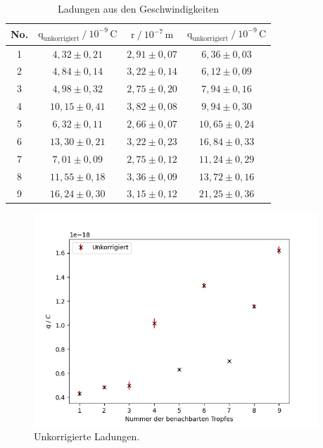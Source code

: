 \begin{table}[H]
    \centering
    \caption{Ladungen aus den Geschwindigkeiten} 
    \label{Tabelle3}
    \begin{tabular} {c  c  c  c}
        \toprule
        { No.} &
        {$\text{q}_{\text{unkorrigiert}} \mathbin{/} 10^{-9}\,\unit{\coulomb}$} &
        {$ \text{r} \mathbin{/} 10^{-7}\,\unit{\meter} $} &
        {$\text{q}_{\text{unkorrigiert}} \mathbin{/} 10^{-9}\,\unit{\coulomb}$}\\
        \midrule
        1 & $4,32  \pm 0,21$ & $2,91 \pm 0,07$ & $6,36  \pm 0,03$ \\
        2 & $4,84  \pm 0,14$ & $3,22 \pm 0,14$ & $6,12  \pm 0,09$ \\
        3 & $4,98  \pm 0,32$ & $2,75 \pm 0,20$ & $7,94  \pm 0,16$ \\
        4 & $10,15 \pm 0,41$ & $3,82 \pm 0,08$ & $9,94  \pm 0,30$ \\
        5 & $6,32  \pm 0,11$ & $2,66 \pm 0,07$ & $10,65 \pm 0,24$ \\
        6 & $13,30 \pm 0,21$ & $3,22 \pm 0,23$ & $16,84 \pm 0,33$ \\
        7 & $7,01  \pm 0,09$ & $2,75 \pm 0,12$ & $11,24 \pm 0,29$ \\
        8 & $11,55 \pm 0,18$ & $3,36 \pm 0,09$ & $13,72 \pm 0,16$ \\
        9 & $16,24 \pm 0,30$ & $3,15 \pm 0,12$ & $21,25 \pm 0,36$ \\
        \bottomrule
    \end{tabular} 
\end{table}

\begin{figure}[H]  
    \centering
    \includegraphics[height=80mm]{bilder/Unkorrigiert.png}
    \caption{Unkorrigierte Ladungen.\label{Abbildung3} }
\end{figure}

